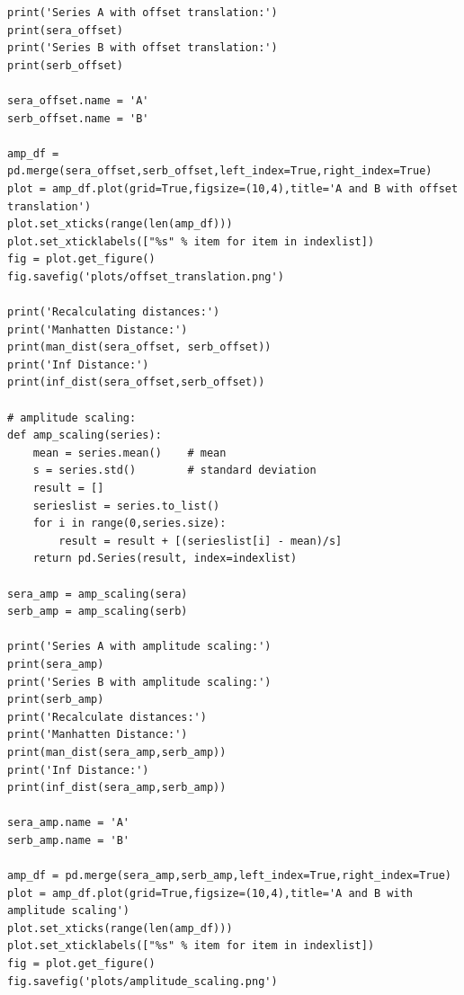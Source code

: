 \begin{lstlisting}
print('Series A with offset translation:')
print(sera_offset)
print('Series B with offset translation:')
print(serb_offset)

sera_offset.name = 'A'
serb_offset.name = 'B'

amp_df = pd.merge(sera_offset,serb_offset,left_index=True,right_index=True)
plot = amp_df.plot(grid=True,figsize=(10,4),title='A and B with offset translation')
plot.set_xticks(range(len(amp_df)))
plot.set_xticklabels(["%s" % item for item in indexlist])
fig = plot.get_figure()
fig.savefig('plots/offset_translation.png')

print('Recalculating distances:')
print('Manhatten Distance:')
print(man_dist(sera_offset, serb_offset))
print('Inf Distance:')
print(inf_dist(sera_offset,serb_offset))

# amplitude scaling:
def amp_scaling(series):
    mean = series.mean()    # mean
    s = series.std()        # standard deviation
    result = []
    serieslist = series.to_list()
    for i in range(0,series.size):
        result = result + [(serieslist[i] - mean)/s]
    return pd.Series(result, index=indexlist)

sera_amp = amp_scaling(sera)
serb_amp = amp_scaling(serb)

print('Series A with amplitude scaling:')
print(sera_amp)
print('Series B with amplitude scaling:')
print(serb_amp)
print('Recalculate distances:')
print('Manhatten Distance:')
print(man_dist(sera_amp,serb_amp))
print('Inf Distance:')
print(inf_dist(sera_amp,serb_amp))

sera_amp.name = 'A'
serb_amp.name = 'B'

amp_df = pd.merge(sera_amp,serb_amp,left_index=True,right_index=True)
plot = amp_df.plot(grid=True,figsize=(10,4),title='A and B with amplitude scaling')
plot.set_xticks(range(len(amp_df)))
plot.set_xticklabels(["%s" % item for item in indexlist])
fig = plot.get_figure()
fig.savefig('plots/amplitude_scaling.png')
    \end{lstlisting}
    

